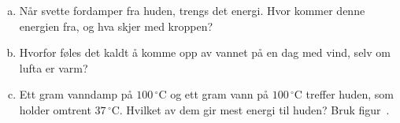 %
\begin{enumerate}[a)]
    \item Når svette fordamper fra huden, trengs det energi. Hvor kommer denne energien fra, og hva skjer med kroppen?
    \item Hvorfor føles det kaldt å komme opp av vannet på en dag med vind, selv om lufta er varm?
    \item Ett gram vanndamp på $100\,^\circ$C og ett gram vann på $100\,^\circ$C treffer huden, som holder omtrent $37\,^\circ$C. Hvilket av dem gir mest energi til huden? Bruk figur~.
\end{enumerate}
%

